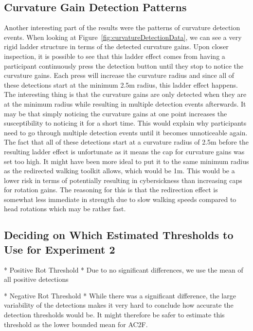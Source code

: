 \subsection{Curvature Gain Detection Patterns}
Another interesting part of the results were the patterns of curvature detection events. When looking at Figure~\ref{fig:curvatureDetectionData}, we can see a very rigid ladder structure in terms of the detected curvature gains. Upon closer inspection, it is possible to see that this ladder effect comes from having a participant continuously press the detection button until they stop to notice the curvature gains. Each press will increase the curvature radius and since all of these detections start at the minimum 2.5m radius, this ladder effect happens. The interesting thing is that the curvature gains are only detected when they are at the minimum radius while resulting in multiple detection events afterwards. It may be that simply noticing the curvature gains at one point increases the susceptibility to noticing it for a short time. This would explain why participants need to go through multiple detection events until it becomes unnoticeable again. The fact that all of these detections start at a curvature radius of 2.5m before the resulting ladder effect is unfortunate as it means the cap for curvature gains was set too high. It might have been more ideal to put it to the same minimum radius as the redirected walking toolkit allows, which would be 1m. This would be a lower risk in terms of potentially resulting in cybersickness than increasing caps for rotation gains. The reasoning for this is that the redirection effect is somewhat less immediate in strength due to slow walking speeds compared to head rotations which may be rather fast. 

\subsection{Deciding on Which Estimated Thresholds to Use for Experiment 2}
* Positive Rot Threshold
   * Due to no significant differences, we use the mean of all positive detections
   
* Negative Rot Threshold
   * While there was a significant difference, the large variability of the detections makes it very hard to conclude how accurate the detection thresholds would be. It might therefore be safer to estimate this threshold as the lower bounded mean for AC2F.
   
